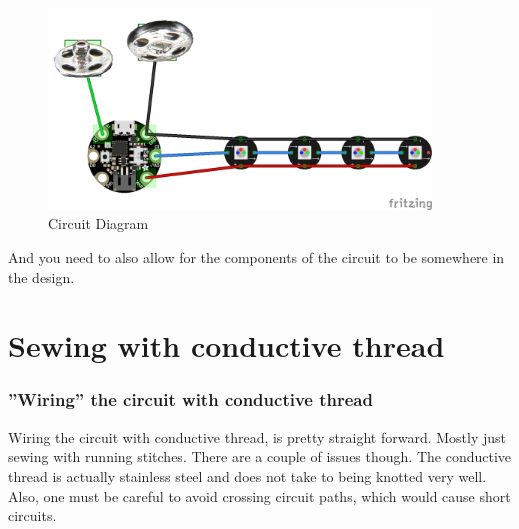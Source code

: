 \documentclass[letterpaper,twoside,12pt]{article}
\begin{document}
\clearpage
\begin{figure}[hbpt]\begin{centering}%
\includegraphics[width=4in]{CircuitDiagram_bb.png}
\caption{Circuit Diagram}
\label{fig:circuitdiagrame}
\end{centering}\end{figure}
And you need to also allow for the components of the circuit to be somewhere 
in the design.
\part{Sewing with conductive thread}
\section{''Wiring'' the circuit with conductive thread}
Wiring the circuit with conductive thread, is pretty straight forward.  Mostly 
just sewing with running stitches.  There are a couple of issues though.  The 
conductive thread is actually stainless steel and does not take to being 
knotted very well.  Also, one must be careful to avoid crossing circuit paths, 
which would cause short circuits.
\end{document}
